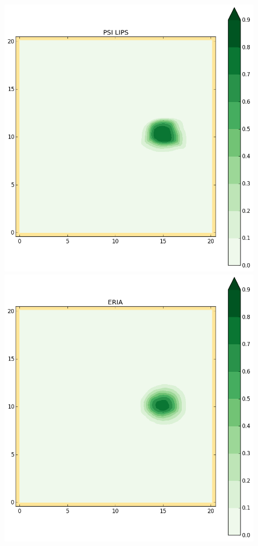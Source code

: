 \begin{figure}[h!]
\begin{minipage}[t]{0.50\textwidth}
\end{minipage}%
\begin{minipage}[t]{0.50\textwidth}
 \centering
 \includegraphics[trim=19mm 19mm 35mm 21mm,clip,scale=0.28]{../img/figure_LIPS.png}
\end{minipage}
\begin{minipage}[t]{0.50\textwidth}
 \centering
 \includegraphics[trim=19mm 19mm 35mm 21mm,clip,scale=0.28]{../img/figure_ERIA.png}

\end{minipage}
\end{figure}
